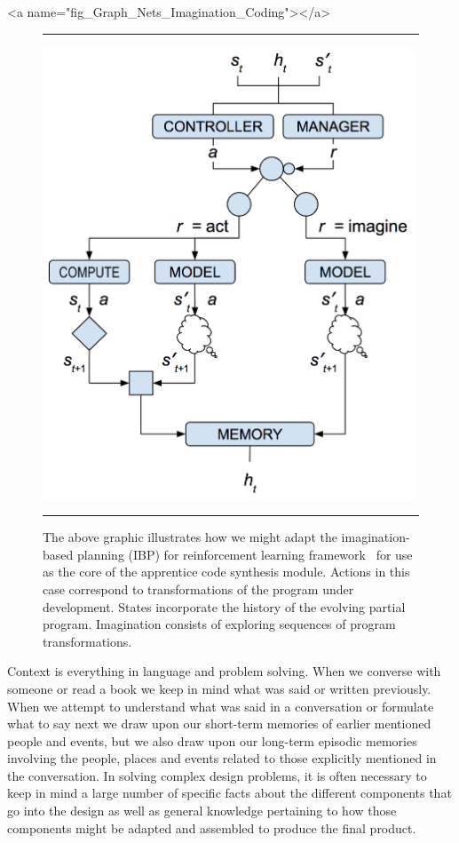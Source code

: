 \rawhtml
<a name="fig_Graph_Nets_Imagination_Coding"></a>
\endrawhtml
\begin{figure}
%
  \hrule{}
%
  \begin{center} 
    \includegraphics[width=315pt]{./figures/Graph_Nets_Imagination_Coding.png} %
  \end{center}
%
  \caption{The above graphic illustrates how we might adapt the imagination-based planning (IBP) for reinforcement learning framework~\cite{PascanuetalCoRR-17} for use as the core of the apprentice code synthesis module. Actions in this case correspond to transformations of the program under development. States incorporate the history of the evolving partial program. Imagination consists of exploring sequences of program transformations.}
%
  \hrule{}
%
\end{figure}


Context is everything in language and problem solving. When we converse with someone or read a book we keep in mind what was said or written previously. When we attempt to understand what was said in a conversation or formulate what to say next we draw upon our short-term memories of earlier mentioned people and events, but we also draw upon our long-term episodic memories involving the people, places and events related to those explicitly mentioned in the conversation. In solving complex design problems, it is often necessary to keep in mind a large number of specific facts about the different components that go into the design as well as general knowledge pertaining to how those components might be adapted and assembled to produce the final product. 

